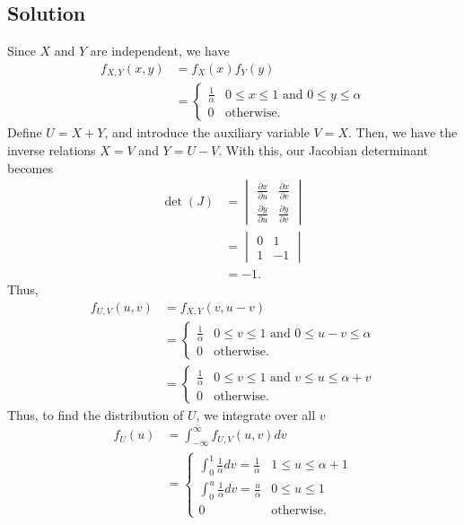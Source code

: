 \documentclass[10pt,a4paper]{article}
\theoremstyle{theorem}
\theoremstyle{definition}
\begin{document}
\subsection*{Solution}
Since $X$ and $Y$ are independent, we have
\begin{align*}
f_{X, Y}(x, y) &= f_X(x) f_Y(y)\\
&= \begin{cases} 
      \frac{1}{\alpha} & 0 \leq x \leq 1 \text{ and } 0 \leq y \leq \alpha \\
      0 & \text{otherwise.}
   \end{cases}
\end{align*}
Define $U = X + Y$, and introduce the auxiliary variable $V = X$. Then, we have the inverse relations $X = V$ and $Y = U - V$. With this, our Jacobian determinant becomes
\begin{align*}
\det(J) &= 
\begin{vmatrix}
\frac{\partial x}{\partial u} & \frac{\partial x}{\partial v}\\
\frac{\partial y}{\partial u} & \frac{\partial y}{\partial v}
\end{vmatrix}\\
&= \begin{vmatrix}
0 & 1\\
1 & -1
\end{vmatrix}\\
&= -1.
\end{align*}
Thus, 
\begin{align*}
f_{U, V}(u, v) &= f_{X, Y}(v, u - v)\\
&= \begin{cases} 
      \frac{1}{\alpha} & 0 \leq v \leq 1 \text{ and } 0 \leq u - v \leq \alpha \\
      0 & \text{otherwise.}
   \end{cases}\\
   &= \begin{cases} 
      \frac{1}{\alpha} & 0 \leq v \leq 1 \text{ and } v \leq u \leq \alpha + v \\
      0 & \text{otherwise.}
   \end{cases}
\end{align*}
Thus, to find the distribution of $U$, we integrate over all $v$
\begin{align*}
f_U(u) &= \int_{-\infty}^{\infty} f_{U, V}(u, v) dv\\
&= \begin{cases} 
      \int_{0}^{1} \frac{1}{\alpha} dv = \frac{1}{\alpha} & 1 \leq u \leq \alpha + 1\\
      \int_{0}^{u} \frac{1}{\alpha} dv = \frac{u}{\alpha} & 0 \leq u \leq 1\\
      0 & \text{otherwise.}
   \end{cases}
\end{align*}
\end{document}
